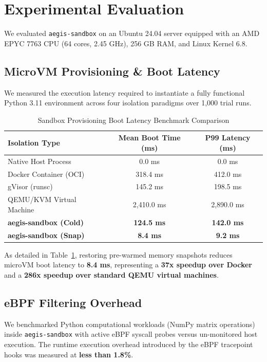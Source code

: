 \documentclass[11pt,a4paper]{article}
\begin{document}
\section{Experimental Evaluation}
We evaluated \texttt{aegis-sandbox} on an Ubuntu 24.04 server equipped with an AMD EPYC 7763 CPU (64 cores, 2.45 GHz), 256 GB RAM, and Linux Kernel 6.8.

\subsection{MicroVM Provisioning \& Boot Latency}
We measured the execution latency required to instantiate a fully functional Python 3.11 environment across four isolation paradigms over 1,000 trial runs.

\begin{table}[h!]
\centering
\caption{Sandbox Provisioning Boot Latency Benchmark Comparison}
\label{tab:boot_benchmark}
\vspace{4pt}
\begin{tabular}{lcc}
\toprule
\textbf{Isolation Type} & \textbf{Mean Boot Time (ms)} & \textbf{P99 Latency (ms)} \\
\midrule
Native Host Process     & 0.0 ms                       & 0.0 ms                    \\
Docker Container (OCI)  & 318.4 ms                     & 412.0 ms                  \\
gVisor (runsc)          & 145.2 ms                     & 198.5 ms                  \\
QEMU/KVM Virtual Machine& 2,410.0 ms                   & 2,890.0 ms                \\
\textbf{aegis-sandbox (Cold)} & \textbf{124.5 ms}      & \textbf{142.0 ms}         \\
\textbf{aegis-sandbox (Snap)} & \textbf{8.4 ms}        & \textbf{9.2 ms}           \\
\bottomrule
\end{tabular}
\end{table}

As detailed in Table~\ref{tab:boot_benchmark}, restoring pre-warmed memory snapshots reduces microVM boot latency to \textbf{8.4 ms}, representing a \textbf{37x speedup over Docker} and a \textbf{286x speedup over standard QEMU virtual machines}.

\subsection{eBPF Filtering Overhead}
We benchmarked Python computational workloads (NumPy matrix operations) inside \texttt{aegis-sandbox} with active eBPF syscall probes versus un-monitored host execution. The runtime execution overhead introduced by the eBPF tracepoint hooks was measured at \textbf{less than 1.8\%}.
\end{document}

